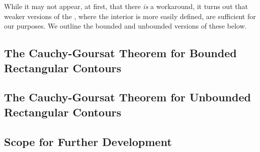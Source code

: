 While it may not appear, at first, that there \textit{is} a workaround, it turns out that weaker versions of the \CGT, where the interior is more easily defined, are sufficient for our purposes. We outline the bounded and unbounded versions of these below.

\subsection{The Cauchy-Goursat Theorem for Bounded Rectangular Contours}

\subsection{The Cauchy-Goursat Theorem for Unbounded Rectangular Contours}

\subsection{Scope for Further Development}

